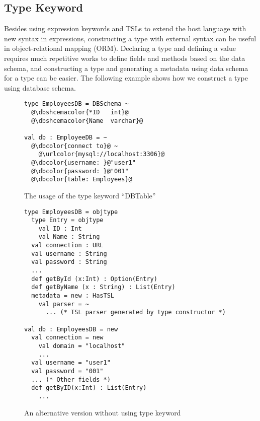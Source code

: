 \documentclass{sig-alternate}
\newcommand{\urlcolor}[1]{\textcolor[HTML]{FFCC33}{#1}}
\newcommand{\dbcolor}[1]{\textcolor[HTML]{FF47FF}{#1}}
\newcommand{\dbshcemacolor}[1]{\textcolor[HTML]{5AC3D1}{#1}}
\begin{document}
\subsection{Type Keyword}
Besides using expression keywords and TSLs to extend the host language with new syntax in expressions, constructing a type with external syntax can be useful in object-relational mapping (ORM). Declaring a type and defining a value requires much repetitive works to define fields and methods based on the data schema, and constructing a type and generating a metadata using data schema for a type can be easier. The following example shows how we construct a type using database schema.

\begin{figure}
\begin{lstlisting}[style=wyvern]
type EmployeesDB = DBSchema ~
  @\dbshcemacolor{*ID   int}@
  @\dbshcemacolor{Name  varchar}@

val db : EmployeeDB = ~
  @\dbcolor{connect to}@ ~
    @\urlcolor{mysql://localhost:3306}@
  @\dbcolor{username: }@"user1"
  @\dbcolor{password: }@"001"
  @\dbcolor{table: Employees}@
\end{lstlisting}
\caption{The usage of the type keyword ``DBTable''}
\end{figure}

\begin{figure}[ht]
\begin{lstlisting}[style=wyvern]
type EmployeesDB = objtype
  type Entry = objtype
    val ID : Int
    val Name : String 
  val connection : URL
  val username : String
  val password : String
  ...
  def getById (x:Int) : Option(Entry)
  def getByName (x : String) : List(Entry)
  metadata = new : HasTSL
    val parser = ~
      ... (* TSL parser generated by type constructor *)

val db : EmployeesDB = new
  val connection = new
    val domain = "localhost"
    ...
  val username = "user1"
  val password = "001"
  ... (* Other fields *)
  def getByID(x:Int) : List(Entry)
    ...
\end{lstlisting}
\caption{An alternative version without using type keyword}
\label{typekw-example-2}
\end{figure}
\end{document}
